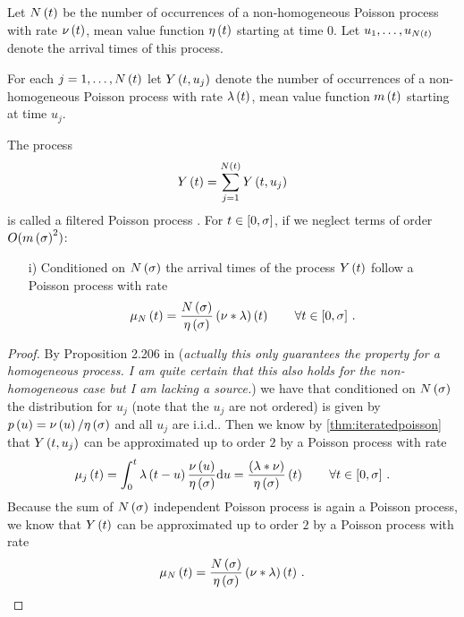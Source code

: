 \documentclass{amsart}
\numberwithin{equation}{section}
\begin{document}
\begin{theorem}\label{thm:twostagepoisson}
Let $N\left(t\right)$ be the number of occurrences of a non-homogeneous Poisson process with rate $\nu\left(t\right)$, mean value function $\eta\left(t\right)$ starting at time $0$. Let $u_1, \dots, u_{N\left(t\right)}$ denote the arrival times of this process.

For each $j = 1, \dots, N\left(t\right)$ let $Y\left(t, u_j\right)$ denote the number of occurrences of a non-homogeneous Poisson process with rate $\lambda\left(t\right)$, mean value function $m\left(t\right)$ starting at time $u_j$.

The process
\[
    Y\left(t\right) = \sum_{j=1}^{N\left(t\right)} Y\left(t, u_j\right)
\]{}
is called a filtered Poisson process \cite[chapter 4, eqn. (5.42)]{parzen1962stochastic}.
For $t \in \left[0, \sigma\right]$, if we neglect terms of order $O(m\left(\sigma\right)^2)$:

\begin{enumerate}
\item[i)] Conditioned on $N\left(\sigma\right)$ the arrival times of the process $Y\left(t\right)$ follow a Poisson process with rate
\[
    \mu_{N}\left(t\right) = \frac{N\left(\sigma\right)}{\eta\left(\sigma\right)} \left(\nu \ast \lambda\right)\left(t\right) \qquad \forall t \in \left[0, \sigma\right] \, .
\]
\end{enumerate}
\end{theorem}
\begin{proof}
By Proposition 2.206 in \cite[p. 147]{intro2015Stoch} (\emph{actually this only guarantees the property for a homogeneous process. I am quite certain that this also holds for the non-homogeneous case but I am lacking a source.}) we have that conditioned on $N\left(\sigma\right)$ the distribution for $u_j$ (note that the $u_j$ are not ordered) is given by $p\left(u\right) = \nu\left(u\right) / \eta\left(\sigma\right)$ and all $u_j$ are i.i.d.. Then we know by \autoref{thm:iteratedpoisson} that $Y\left(t, u_j\right)$ can be approximated up to order $2$ by a Poisson process with rate
\begin{equation*}
\mu_j\left(t\right) = \int_0^t\lambda\left(t-u\right) \frac{\nu\left(u\right)}{\eta\left(\sigma\right)} \mathrm{d}u = \frac{\left(\lambda \ast \nu\right)}{\eta\left(\sigma\right)} \left(t\right) \qquad \forall t \in \left[0, \sigma\right] \, .
\end{equation*}
Because the sum of $N\left(\sigma\right)$ independent Poisson process is again a Poisson process, we know that $Y\left(t\right)$ can be approximated up to order $2$ by a Poisson process with rate
\[
    \mu_{N}\left(t\right) = \frac{N\left(\sigma\right)}{\eta\left(\sigma\right)} \left(\nu \ast \lambda\right)\left(t\right) \, .
\]{}
\end{proof}
\end{document}
